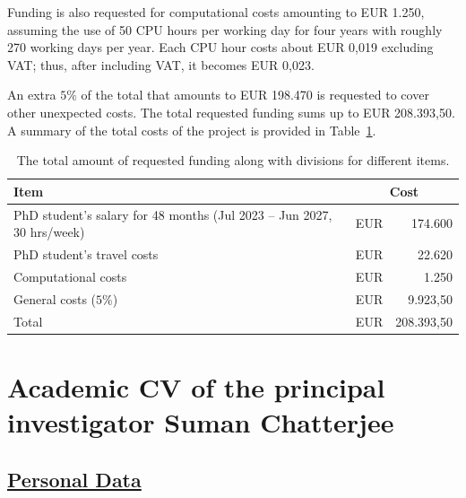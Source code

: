 \documentclass[a4paper,11pt]{article}
\begin{document}
Funding is also requested for computational costs amounting to EUR 1.250, assuming the use of 50 CPU hours per working day for four years with roughly 270 working days per year. Each CPU hour costs about EUR 0,019 excluding VAT; thus, after including VAT, it becomes EUR 0,023. 

An extra $5\%$ of the total that amounts to EUR 198.470 is requested to cover other unexpected costs.  
The total requested funding sums up to EUR 208.393,50. 
A summary of the total costs of the project is provided in Table~\ref{Tab:Total_cost}.
\begin{table}
\caption{The total amount of requested funding along with divisions for different items.}
\begin{center}
{\renewcommand{\arraystretch}{1.3}
\begin{tabular}{m{6 cm}| r r}
Item & \multicolumn{2}{c}{ Cost } \\
\hline 
PhD student's salary for 48 months (Jul 2023 -- Jun 2027, 30 hrs/week) & EUR & 174.600  \\
PhD student's travel costs & EUR & 22.620 \\
Computational costs & EUR & 1.250 \\
\hline
General costs ($5\%$) & EUR & 9.923,50  \\
\hline
Total & EUR & 208.393,50
\end{tabular}
}
\end{center}
\label{Tab:Total_cost}
\end{table}

\newpage
\clearpage

\section{Academic CV of the principal investigator Suman Chatterjee}

\subsection*{\underline{Personal Data}}
\end{document}
